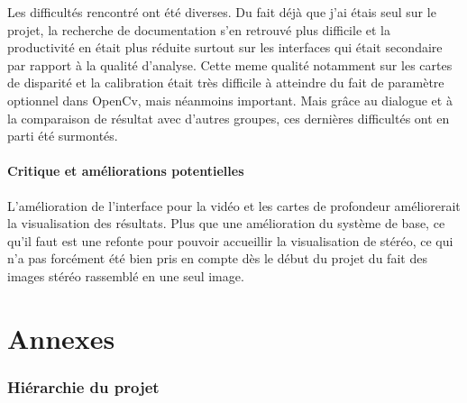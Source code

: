 \documentclass{article}
\begin{document}
Les difficultés rencontré ont été diverses. Du fait déjà que j'ai étais seul sur le projet, la recherche de documentation s'en retrouvé plus difficile et la productivité en était plus réduite surtout sur les interfaces qui était secondaire par rapport à la qualité d'analyse. Cette meme qualité notamment sur les cartes de disparité et la calibration était très difficile à atteindre du fait de paramètre optionnel dans OpenCv, mais néanmoins important. Mais grâce au dialogue et à la comparaison de résultat avec d'autres groupes, ces dernières difficultés ont en parti été surmontés.

\subsection{Critique et améliorations potentielles}

L'amélioration de l'interface pour la vidéo et les cartes de profondeur améliorerait la visualisation des résultats. Plus que une amélioration du système de base, ce qu'il faut est une refonte pour pouvoir accueillir la visualisation de stéréo, ce qui n'a pas forcément été bien pris en compte dès le début du projet du fait des images stéréo rassemblé en une seul image.

\newpage
\appendix
\part{Annexes}

\listoffigures

\newpage
\section{Hiérarchie du projet}

\end{document}
